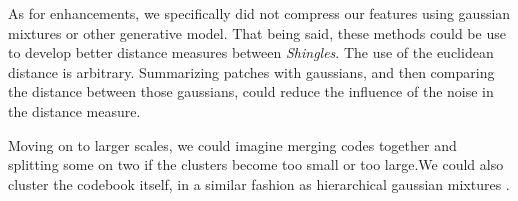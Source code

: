\documentclass{article}
\begin{document}
As for enhancements, we specifically did not compress our features using
gaussian mixtures or other generative model. That being said, these methods
could be use to develop better distance measures between \textit{Shingles}.
The use of the euclidean distance is arbitrary. Summarizing patches
with gaussians, and then comparing the distance between those gaussians,
could reduce the influence of the noise in the distance measure.

Moving on to larger scales, we could imagine merging codes together and
splitting some on two if the clusters become too small or too large.We could
also cluster the codebook itself, in a similar fashion as hierarchical
gaussian mixtures \cite{Vasconcelos2001}.


\small



\end{document}
